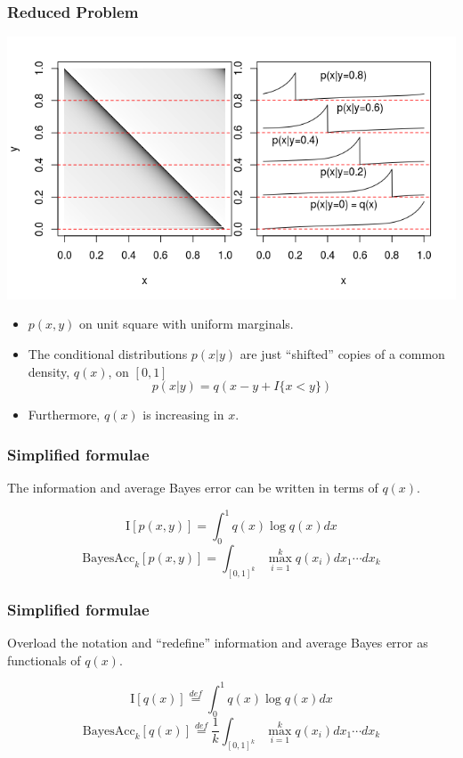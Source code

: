 \documentclass{beamer}
\begin{document}
\begin{frame}
\frametitle{Reduced Problem}

\begin{center}
\includegraphics[scale = 0.4]{../diagram/qxplot.png}
\end{center}

\begin{itemize}
\item $p(x, y)$ on unit square with uniform marginals.
\item The conditional distributions $p(x|y)$ are just ``shifted'' copies of a common density, $q(x)$, on $[0,1]$
\[
p(x|y) = q(x - y + I\{x < y\})
\]
\item Furthermore, $q(x)$ is increasing in $x$.
\end{itemize}

\end{frame}

\begin{frame}
\frametitle{Simplified formulae}

The information and average Bayes error can be written in terms of $q(x)$.

\[
\text{I}[p(x, y)] = \int_0^1 q(x) \log q(x) dx
\]
\[
\text{BayesAcc}_k[p(x, y)] = \int_{[0, 1]^k} \max_{i=1}^k q(x_i) dx_1 \cdots dx_k
\]



\end{frame}

\begin{frame}
\frametitle{Simplified formulae}

Overload the notation and ``redefine'' information and average Bayes error as functionals of $q(x)$.

\[
\text{I}[q(x)] \stackrel{def}{=} \int_0^1 q(x) \log q(x) dx
\]
\[
\text{BayesAcc}_k[q(x)] \stackrel{def}{=} \frac{1}{k}\int_{[0, 1]^k} \max_{i=1}^k q(x_i) dx_1 \cdots dx_k
\]

\end{frame}
\end{document}
